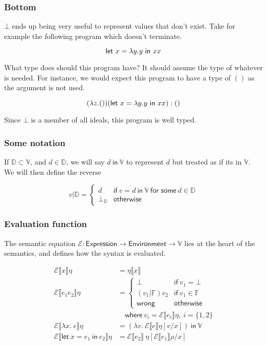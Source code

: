\subsubsection{Bottom}
$\bot$ ends up being very useful to represent values that don't exist.
Take for example the following program which doesn't terminate. 

\[\mathsf{let} \ x = \lambda y. y \ \mathsf{in} \ x x\]

What type does should this program have? It should assume the
type of whatever is needed. For instance, we would expect this program
to have a type of $()$ as the argument is not used.

$$(\lambda z. ()) (\mathsf{let} \ x = \lambda y. y \ \mathsf{in} \ x x) : ()$$

Since $\bot$ is a member of all ideals, this program is well typed.

\subsubsection{Some notation}

If $\mathbb{D} \subset \mathbb{V}$, and $d \in \mathbb{D}$, we will say $d \ \mathsf{in} \
\mathbb{V}$ to represent $d$ but treated as if its in $\mathbb{V}$. \\
We will then define the reverse

$$v | \mathbb{D} =
\begin{cases}
  d & \textsf{if} \ v = d \ \textsf{in} \ \mathbb{V} \ \textsf{for
    some} \ d \in \mathbb{D} \\
  \bot_{\mathbb{D}} & \textsf{otherwise}
\end{cases}
$$


\subsubsection{Evaluation function}
The semantic equation $\mathcal{E} : \mathsf{Expression} \rightarrow
\mathsf{Environment} \rightarrow \mathbb{V}$ lies at the heart of the semantics,
and defines how the syntax is evaluated.

\begin{align*}
  \mathcal{E} \llbracket x \rrbracket \eta
  &= \eta \llbracket x \rrbracket \\
  \mathcal{E} \llbracket e_1 e_2 \rrbracket \eta
  &=
    \begin{cases}
      \bot & \mathsf{if} \ v_1 = \bot \\
      (v_1 | \mathbb{F}) v_2 & \mathsf{if} \ v_1 \in \mathbb{F} \\
      \mathsf{wrong} & \mathsf{otherwise}
    \end{cases}
  \\
  & \quad \textsf{where} \ v_i = \mathcal{E} \llbracket e_i \rrbracket \eta , \ i = \{
    1, 2\} \\
  \mathcal{E} \llbracket \lambda x . \ e \rrbracket \eta
  &=
    (\lambda v . \ \mathcal{E} \llbracket e \rrbracket \eta [v / x ])
    \ \mathsf{in} \ \mathbb{V} \\
  \mathcal{E} \llbracket \textsf{let} \ x = e_1 \ \textsf{in} \ e_2 \rrbracket \eta
  &=
    \mathcal{E} \llbracket e_2 \rrbracket \ \eta [ \mathcal{E} \llbracket e_1 \rrbracket\rho / x ]
\end{align*}


